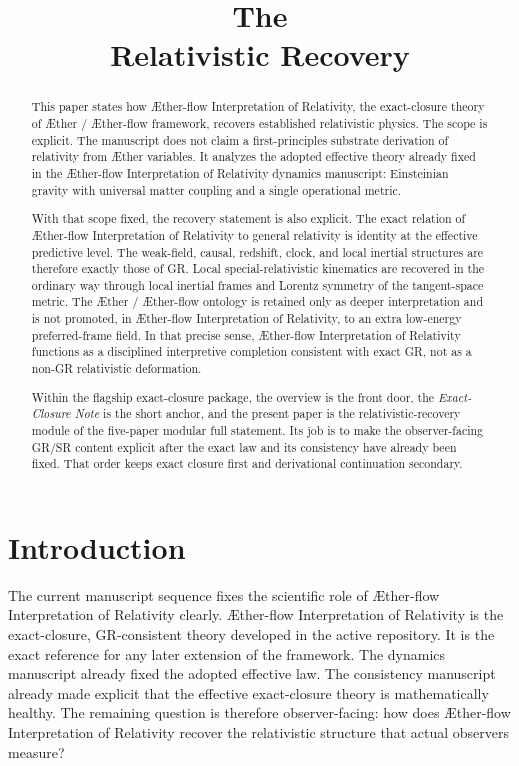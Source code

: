 \documentclass[11pt]{article}
\title{\textbf{The \TheoryName{}}\\[0.4em]
\large Relativistic Recovery}
\author{}
\date{}
\newcommand{\Aether}{\AE{}ther}
\newcommand{\Aflow}{\AE{}ther-flow}
\newcommand{\TheoryName}{\Aflow{} Interpretation of Relativity}
\newcommand{\TheoryProgram}{\Aether{} / \Aflow{} framework}
\begin{document}
\maketitle

\begin{abstract}
This paper states how \TheoryName{}, the exact-closure theory of \TheoryProgram{}, recovers established relativistic physics. The scope is explicit. The manuscript does not claim a first-principles substrate derivation of relativity from \Aether{} variables. It analyzes the adopted effective theory already fixed in the \TheoryName{} dynamics manuscript: Einsteinian gravity with universal matter coupling and a single operational metric.

With that scope fixed, the recovery statement is also explicit. The exact relation of \TheoryName{} to general relativity is identity at the effective predictive level. The weak-field, causal, redshift, clock, and local inertial structures are therefore exactly those of GR. Local special-relativistic kinematics are recovered in the ordinary way through local inertial frames and Lorentz symmetry of the tangent-space metric. The \Aether{} / \Aflow{} ontology is retained only as deeper interpretation and is not promoted, in \TheoryName{}, to an extra low-energy preferred-frame field. In that precise sense, \TheoryName{} functions as a disciplined interpretive completion consistent with exact GR, not as a non-GR relativistic deformation.

Within the flagship exact-closure package, the overview is the front door, the \emph{Exact-Closure Note} is the short anchor, and the present paper is the relativistic-recovery module of the five-paper modular full statement. Its job is to make the observer-facing GR/SR content explicit after the exact law and its consistency have already been fixed. That order keeps exact closure first and derivational continuation secondary.
\end{abstract}

\section{Introduction}

The current manuscript sequence fixes the scientific role of \TheoryName{} clearly. \TheoryName{} is the exact-closure, GR-consistent theory developed in the active repository. It is the exact reference for any later extension of the framework. The dynamics manuscript already fixed the adopted effective law. The consistency manuscript already made explicit that the effective exact-closure theory is mathematically healthy. The remaining question is therefore observer-facing: how does \TheoryName{} recover the relativistic structure that actual observers measure?
\end{document}
